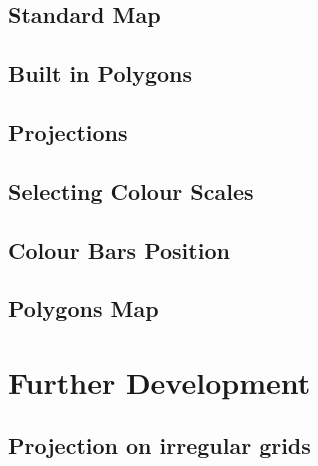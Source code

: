 \documentclass[a4paper,10pt]{article}
\begin{document}
\subsection{Standard Map}
\subsection{Built in Polygons}
\subsection{Projections}
\subsection{Selecting Colour Scales}
\subsection{Colour Bars Position}
\subsection{Polygons Map}
\section{Further Development}
\subsection{Projection on irregular grids}
\end{document}
